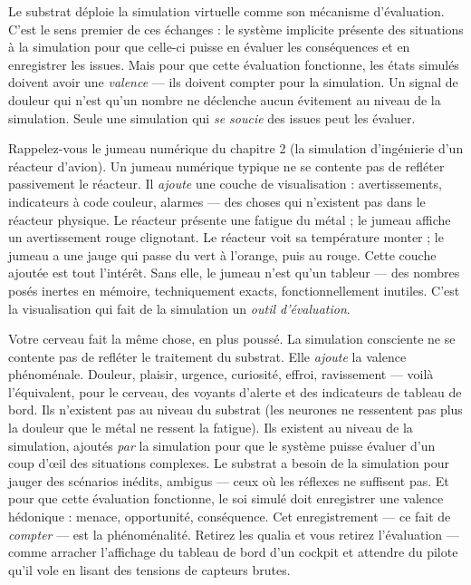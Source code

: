 \documentclass[11pt, twoside, openright]{book}
\begin{document}
Le substrat déploie la simulation virtuelle comme son mécanisme d'évaluation. C'est le sens premier de ces échanges : le système implicite présente des situations à la simulation pour que celle-ci puisse en évaluer les conséquences et en enregistrer les issues. Mais pour que cette évaluation fonctionne, les états simulés doivent avoir une \textit{valence} --- ils doivent compter pour la simulation. Un signal de douleur qui n'est qu'un nombre ne déclenche aucun évitement au niveau de la simulation. Seule une simulation qui \textit{se soucie} des issues peut les évaluer.

Rappelez-vous le jumeau numérique du chapitre 2 (la simulation d'ingénierie d'un réacteur d'avion). Un jumeau numérique typique ne se contente pas de refléter passivement le réacteur. Il \textit{ajoute} une couche de visualisation : avertissements, indicateurs à code couleur, alarmes --- des choses qui n'existent pas dans le réacteur physique. Le réacteur présente une fatigue du métal ; le jumeau affiche un avertissement rouge clignotant. Le réacteur voit sa température monter ; le jumeau a une jauge qui passe du vert à l'orange, puis au rouge. Cette couche ajoutée est tout l'intérêt. Sans elle, le jumeau n'est qu'un tableur --- des nombres posés inertes en mémoire, techniquement exacts, fonctionnellement inutiles. C'est la visualisation qui fait de la simulation un \textit{outil d'évaluation}.

Votre cerveau fait la même chose, en plus poussé. La simulation consciente ne se contente pas de refléter le traitement du substrat. Elle \textit{ajoute} la valence phénoménale. Douleur, plaisir, urgence, curiosité, effroi, ravissement --- voilà l'équivalent, pour le cerveau, des voyants d'alerte et des indicateurs de tableau de bord. Ils n'existent pas au niveau du substrat (les neurones ne ressentent pas plus la douleur que le métal ne ressent la fatigue). Ils existent au niveau de la simulation, ajoutés \textit{par} la simulation pour que le système puisse évaluer d'un coup d'œil des situations complexes. Le substrat a besoin de la simulation pour jauger des scénarios inédits, ambigus --- ceux où les réflexes ne suffisent pas. Et pour que cette évaluation fonctionne, le soi simulé doit enregistrer une valence hédonique : menace, opportunité, conséquence. Cet enregistrement --- ce fait de \textit{compter} --- est la phénoménalité. Retirez les qualia et vous retirez l'évaluation --- comme arracher l'affichage du tableau de bord d'un cockpit et attendre du pilote qu'il vole en lisant des tensions de capteurs brutes.
\end{document}
